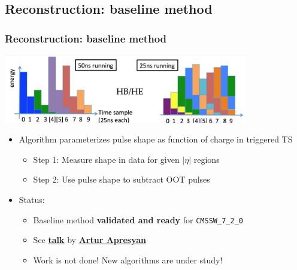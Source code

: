 \documentclass[bigger]{beamer}
\providecommand{\alert}[1]{\textbf{#1}}
\begin{document}
\subsection{Reconstruction: baseline method}
\label{sec-3-2}
\begin{frame}
\frametitle{Reconstruction: baseline method}
\label{sec-3-2-1}
\label{sec-3-2-1-1}

\centering
\includegraphics[width=0.8\textwidth]{fig/hcal25ns.png}
\begin{itemize}

\item Algorithm parameterizes pulse shape as function of charge in triggered TS
\label{sec-3-2-1-2}%
\begin{itemize}

\item Step 1: Measure shape in data for given $|\eta|$ regions
\label{sec-3-2-1-2-1}%

\item Step 2: Use pulse shape to subtract OOT pulses
\label{sec-3-2-1-2-2}%
\end{itemize} %

\item Status:
\label{sec-3-2-1-3}%
\begin{itemize}

\item Baseline method \alert{validated and ready} for \texttt{CMSSW\_7\_2\_0}
\label{sec-3-2-1-3-1}%

\item See \href{https://indico.cern.ch/event/318703/session/2/contribution/7/material/slides/0.pdf}{\underline{\alert{talk}}} by \href{mailto:artur.apresyan@cern.ch}{\underline{\alert{Artur Apresyan}}}
\label{sec-3-2-1-3-2}%

\item Work is not done!  New algorithms are under study!
\label{sec-3-2-1-3-3}%
\end{itemize} %
\end{itemize} %
\end{frame}
\end{document}
